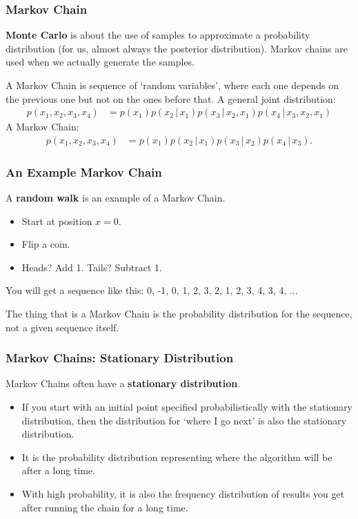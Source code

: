 \documentclass{beamer}
\newcommand{\given}{\,|\,}
\begin{document}
\begin{frame}
\frametitle{Markov Chain}
{\bf Monte Carlo} is about the use of samples to approximate a probability
distribution (for us, almost always the posterior distribution). Markov chains
are used when we actually generate the samples.
\pause

A Markov Chain is sequence of `random variables', where each one
depends on the previous one but not on the ones before that.
A general joint distribution:
\begin{align}
p(x_1, x_2, x_3, x_4) &= p(x_1)p(x_2 \given x_1)p(x_3 \given x_2, x_1)
                    p(x_4 \given x_3, x_2, x_1)
\end{align}
A Markov Chain:
\begin{align}
p(x_1, x_2, x_3, x_4) &= p(x_1)p(x_2 \given x_1)p(x_3 \given x_2)p(x_4 \given x_3).
\end{align}


\end{frame}


\begin{frame}
\frametitle{An Example Markov Chain}
A {\bf random walk} is an example of a Markov Chain.

\begin{itemize}
\item Start at position $x=0$.\pause
\item Flip a coin.\pause
\item Heads? Add 1. Tails? Subtract 1.\pause
\end{itemize}

You will get a sequence like this:
0, -1, 0, 1, 2, 3, 2, 1, 2, 3, 4, 3, 4, ...
\pause

The thing that is a Markov Chain is the probability distribution for the
sequence, not a given sequence itself.

\end{frame}

\begin{frame}
\frametitle{Markov Chains: Stationary Distribution}
Markov Chains often have a {\bf stationary distribution}.

\begin{itemize}
\item If you start with an initial point specified probabilistically
with the stationary distribution, then the distribution for `where I go next'
is also the stationary distribution.\pause
\item It is the probability distribution representing where the
algorithm will be after a long time.\pause
\item With high probability, it is also the
frequency distribution of results you get
after running the chain for a long time.
\end{itemize}


\end{frame}
\end{document}
